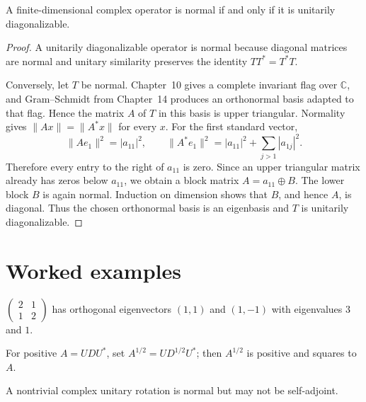 \begin{theorem}\label{thm:i16-03}
A finite-dimensional complex operator is normal if and only if it is unitarily
diagonalizable.
\begin{proof}
A unitarily diagonalizable operator is normal because diagonal matrices are
normal and unitary similarity preserves the identity \(TT^*=T^*T\).

Conversely, let \(T\) be normal. Chapter~10 gives a complete invariant flag
over \(\mathbb C\), and Gram--Schmidt from Chapter~14 produces an orthonormal
basis adapted to that flag. Hence the matrix \(A\) of \(T\) in this basis is
upper triangular. Normality gives \(\|Ax\|=\|A^*x\|\) for every \(x\). For the
first standard vector,
\[
\|Ae_1\|^2=|a_{11}|^2,
\qquad
\|A^*e_1\|^2=|a_{11}|^2+\sum_{j>1}|a_{1j}|^2.
\]
Therefore every entry to the right of \(a_{11}\) is zero. Since an upper
triangular matrix already has zeros below \(a_{11}\), we obtain a block
matrix \(A=a_{11}\oplus B\). The lower block \(B\) is again normal. Induction
on dimension shows that \(B\), and hence \(A\), is diagonal. Thus the chosen
orthonormal basis is an eigenbasis and \(T\) is unitarily diagonalizable.
\end{proof}
\end{theorem}

\section{Worked examples}

\begin{example}\label{ex:i16-worked-01}
$\begin{pmatrix}2&1\\1&2\end{pmatrix}$ has orthogonal eigenvectors $(1,1)$ and $(1,-1)$ with eigenvalues $3$ and $1$.
\end{example}

\begin{example}\label{ex:i16-worked-02}
For positive $A=UDU^*$, set $A^{1/2}=UD^{1/2}U^*$; then $A^{1/2}$ is positive and squares to $A$.
\end{example}

\begin{example}\label{ex:i16-worked-03}
A nontrivial complex unitary rotation is normal but may not be self-adjoint.
\end{example}

